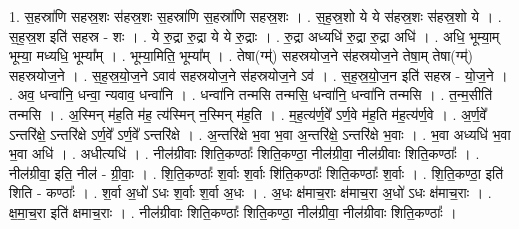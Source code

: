 \documentclass[17pt]{extarticle}
\begin{document}
1. स॒हस्रा॑णि सहस्र॒शः स॑हस्र॒शः स॒हस्रा॑णि स॒हस्रा॑णि सहस्र॒शः । . स॒ह॒स्र॒शो ये ये स॑हस्र॒शः स॑हस्र॒शो ये । . स॒ह॒स्र॒श इति॑ सहस्र - शः । . ये रु॒द्रा रु॒द्रा ये ये रु॒द्राः । . रु॒द्रा अध्यधि॑ रु॒द्रा रु॒द्रा अधि॑ । . अधि॒ भूम्या॒म् भूम्या॒ मध्यधि॒ भूम्या᳚म् । . भूम्या॒मिति॒ भूम्या᳚म् । . तेषा(ग्म्॑) सहस्रयोज॒ने स॑हस्रयोज॒ने तेषा॒म् तेषा(ग्म्॑) सहस्रयोज॒ने । . स॒ह॒स्र॒यो॒ज॒ने ऽवाव॑ सहस्रयोज॒ने स॑हस्रयोज॒ने ऽव॑ । . स॒ह॒स्र॒यो॒ज॒न इति॑ सहस्र - यो॒ज॒ने । . अव॒ धन्वा॑नि॒ धन्वा॒ न्यवाव॒ धन्वा॑नि । . धन्वा॑नि तन्मसि तन्मसि॒ धन्वा॑नि॒ धन्वा॑नि तन्मसि । . त॒न्म॒सीति॑ तन्मसि । . अ॒स्मिन् म॑ह॒ति म॑ह॒ त्य॑स्मिन् न॒स्मिन् म॑ह॒ति । . म॒ह॒त्य॑र्ण॒वे᳚ ऽर्ण॒वे म॑ह॒ति म॑ह॒त्य॑र्ण॒वे । . अ॒र्ण॒वे᳚ ऽन्तरि॑क्षे॒ ऽन्तरि॑क्षे ऽर्ण॒वे᳚ ऽर्ण॒वे᳚ ऽन्तरि॑क्षे । . अ॒न्तरि॑क्षे भ॒वा भ॒वा अ॒न्तरि॑क्षे॒ ऽन्तरि॑क्षे भ॒वाः । . भ॒वा अध्यधि॑ भ॒वा भ॒वा अधि॑ । . अधीत्यधि॑ । . नील॑ग्रीवाः शिति॒कण्ठाः᳚ शिति॒कण्ठा॒ नील॑ग्रीवा॒ नील॑ग्रीवाः शिति॒कण्ठाः᳚ । . नील॑ग्रीवा॒ इति॒ नील॑ - ग्री॒वाः॒ । . शि॒ति॒कण्ठाः᳚ श॒र्वाः श॒र्वाः शि॑ति॒कण्ठाः᳚ शिति॒कण्ठाः᳚ श॒र्वाः । . शि॒ति॒कण्ठा॒ इति॑ शिति - कण्ठाः᳚ । . श॒र्वा अ॒धो॑ ऽधः श॒र्वाः श॒र्वा अ॒धः । . अ॒धः क्ष॑माच॒राः क्ष॑माच॒रा अ॒धो॑ ऽधः क्ष॑माच॒राः । . क्ष॒मा॒च॒रा इति॑ क्षमाच॒राः । . नील॑ग्रीवाः शिति॒कण्ठाः᳚ शिति॒कण्ठा॒ नील॑ग्रीवा॒ नील॑ग्रीवाः शिति॒कण्ठाः᳚ । \newline
\end{document}
